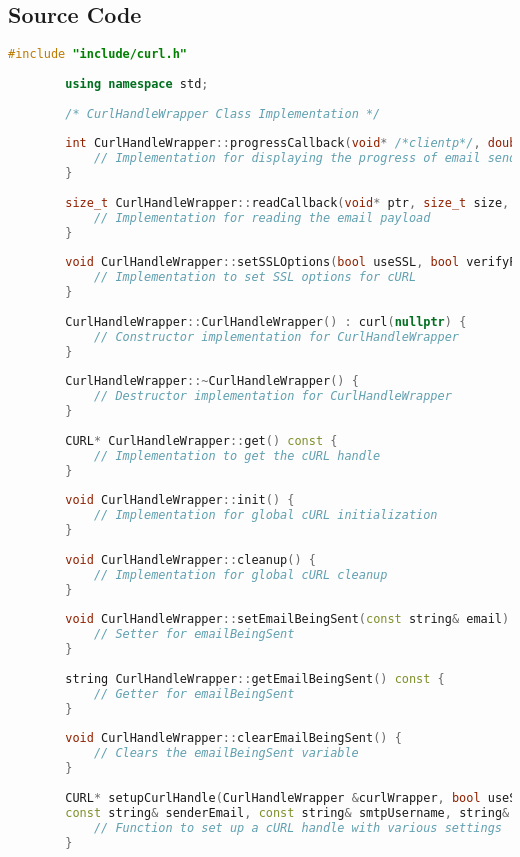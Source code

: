 \documentclass{article}
\begin{document}
	\subsection*{Source Code}
	\begin{lstlisting}[language=C++]
		#include "include/curl.h"
		
		using namespace std;
		
		/* CurlHandleWrapper Class Implementation */
		
		int CurlHandleWrapper::progressCallback(void* /*clientp*/, double dltotal, double dlnow, double /*ultotal*/, double /*ulnow*/) {
			// Implementation for displaying the progress of email sending
		}
		
		size_t CurlHandleWrapper::readCallback(void* ptr, size_t size, size_t nmemb, void* userp) {
			// Implementation for reading the email payload
		}
		
		void CurlHandleWrapper::setSSLOptions(bool useSSL, bool verifyPeer, bool verifyHost) {
			// Implementation to set SSL options for cURL
		}
		
		CurlHandleWrapper::CurlHandleWrapper() : curl(nullptr) {
			// Constructor implementation for CurlHandleWrapper
		}
		
		CurlHandleWrapper::~CurlHandleWrapper() {
			// Destructor implementation for CurlHandleWrapper
		}
		
		CURL* CurlHandleWrapper::get() const {
			// Implementation to get the cURL handle
		}
		
		void CurlHandleWrapper::init() {
			// Implementation for global cURL initialization
		}
		
		void CurlHandleWrapper::cleanup() {
			// Implementation for global cURL cleanup
		}
		
		void CurlHandleWrapper::setEmailBeingSent(const string& email) {
			// Setter for emailBeingSent
		}
		
		string CurlHandleWrapper::getEmailBeingSent() const {
			// Getter for emailBeingSent
		}
		
		void CurlHandleWrapper::clearEmailBeingSent() {
			// Clears the emailBeingSent variable
		}
		
		CURL* setupCurlHandle(CurlHandleWrapper &curlWrapper, bool useSSL, bool verifyPeer, bool verifyHost, bool verbose, 
		const string& senderEmail, const string& smtpUsername, string& mailPassDecrypted, int smtpPort, const string& smtpServer) {
			// Function to set up a cURL handle with various settings
		}
	\end{lstlisting}
	
\end{document}
